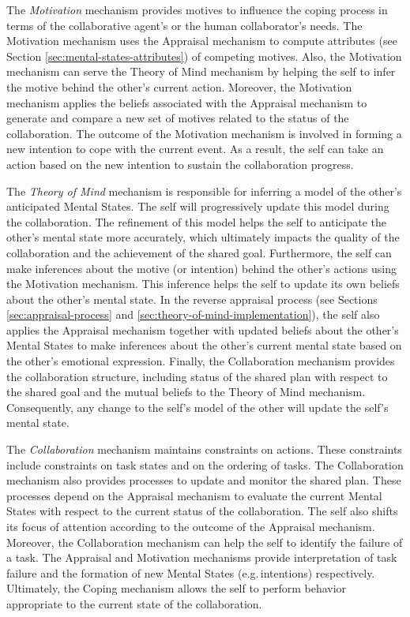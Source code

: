 \documentclass[12pt]{report}
\begin{document}
The \textit{Motivation} mechanism provides motives to influence the coping
process in terms of the collaborative agent's or the human collaborator's needs.
The Motivation mechanism uses the Appraisal mechanism to compute attributes (see
Section \ref{sec:mental-states-attributes}) of competing motives. Also, the
Motivation mechanism can serve the Theory of Mind mechanism by helping the self
to infer the motive behind the other's current action. Moreover, the Motivation
mechanism applies the beliefs associated with the Appraisal mechanism to
generate and compare a new set of motives related to the status of the
collaboration. The outcome of the Motivation mechanism is involved in forming a
new intention to cope with the current event. As a result, the self can take an
action based on the new intention to sustain the collaboration progress.

The \textit{Theory of Mind} mechanism is responsible for inferring a model of
the other's anticipated Mental States. The self will progressively update this
model during the collaboration. The refinement of this model helps the self to
anticipate the other's mental state more accurately, which ultimately impacts
the quality of the collaboration and the achievement of the shared goal.
Furthermore, the self can make inferences about the motive (or intention) behind
the other's actions using the Motivation mechanism. This inference helps the
self to update its own beliefs about the other's mental state. In the reverse
appraisal process (see Sections \ref{sec:appraisal-process} and
\ref{sec:theory-of-mind-implementation}), the self also applies the Appraisal
mechanism together with updated beliefs about the other's Mental States to make
inferences about the other's current mental state based on the other's emotional
expression. Finally, the Collaboration mechanism provides the collaboration
structure, including status of the shared plan with respect to the shared goal
and the mutual beliefs to the Theory of Mind mechanism. Consequently, any change
to the self's model of the other will update the self's mental state.

The \textit{Collaboration} mechanism maintains constraints on actions. These
constraints include constraints on task states and on the ordering of tasks. The
Collaboration mechanism also provides processes to update and monitor the shared
plan. These processes depend on the Appraisal mechanism to evaluate the current
Mental States with respect to the current status of the collaboration. The self
also shifts its focus of attention according to the outcome of the Appraisal
mechanism. Moreover, the Collaboration mechanism can help the self to identify the
failure of a task. The Appraisal and Motivation mechanisms provide interpretation
of task failure and the formation of new Mental States (e.g.\,intentions)
respectively. Ultimately, the Coping mechanism allows the self to perform behavior
appropriate to the current state of the collaboration.
\end{document}
